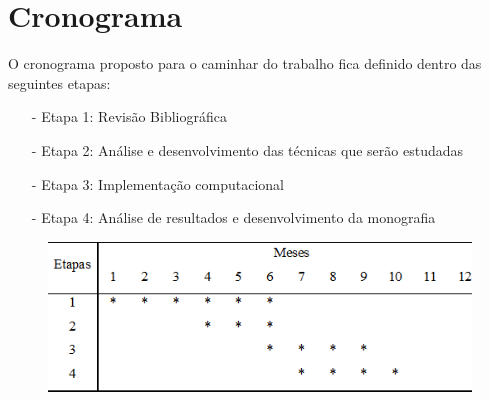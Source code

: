 \chapter{Cronograma}
\label{c.cronograma}

O cronograma proposto para o caminhar do trabalho fica definido dentro das seguintes etapas:
\begin{itemize}
	\item[-] Etapa 1: Revisão Bibliográfica
	\item[-] Etapa 2: Análise e desenvolvimento das técnicas que serão estudadas
	\item[-] Etapa 3: Implementação computacional
	\item[-] Etapa 4: Análise de resultados e desenvolvimento da monografia
\end{itemize}

\begin{figure}[h]
\centering
\includegraphics[scale=0.7]{figs/cronograma.png}
\label{f.cronograma}
\end{figure}





